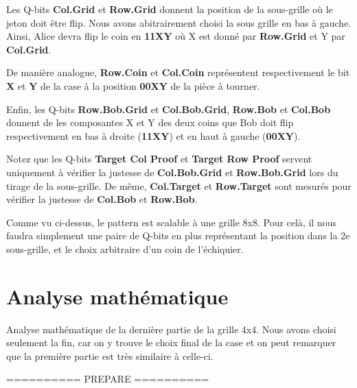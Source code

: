 \documentclass[12pt]{article}
\begin{document}
    \vspace{5mm}

    Les Q-bits \textbf{Col.Grid} et \textbf{Row.Grid} donnent la position de la sous-grille où le jeton doit être flip. Nous avons abitrairement choisi la sous grille en bas à gauche. Ainsi, Alice devra flip le coin en \textbf{11XY} où X est donné par \textbf{Row.Grid} et Y par \textbf{Col.Grid}.

    \vspace{5mm}

    De manière analogue, \textbf{Row.Coin} et \textbf{Col.Coin} représentent respectivement le bit \textbf{X} et \textbf{Y} de la case à la position \textbf{00XY} de la pièce à tourner.

    \vspace{5mm}

    Enfin, les Q-bits \textbf{Row.Bob.Grid} et \textbf{Col.Bob.Grid}, \textbf{Row.Bob} et \textbf{Col.Bob} donnent de les composantes X et Y des deux coins que Bob doit flip respectivement en bas à droite (\textbf{11XY}) et en haut à gauche (\textbf{00XY}).

    \vspace{5mm}
    Notez que les Q-bits \textbf{Target Col Proof} et \textbf{Target Row Proof} servent uniquement à vérifier la justesse de \textbf{Col.Bob.Grid} et \textbf{Row.Bob.Grid} lors du tirage de la sous-grille.
    De même, \textbf{Col.Target} et \textbf{Row.Target} sont mesurés pour vérifier la justesse de \textbf{Col.Bob} et \textbf{Row.Bob}.

    \vspace{10mm}
    Comme vu ci-dessus, le pattern est scalable à une grille 8x8. Pour celà, il nous faudra simplement une paire de Q-bits en plus représentant la position dans la 2e sous-grille, et le choix arbitraire d'un coin de l'échiquier.

    \section{Analyse mathématique}

    Analyse mathématique de la dernière partie de la grille 4x4. Nous avons choisi seulement la fin, car on y trouve le choix final de la case et on peut remarquer que la première partie est très similaire à celle-ci.

    \centering ========== PREPARE ========== \\
\end{document}
